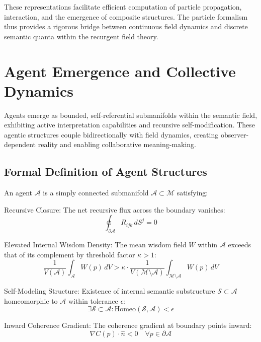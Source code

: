These representations facilitate efficient computation of particle propagation, interaction, and the emergence of composite structures. The particle formalism thus provides a rigorous bridge between continuous field dynamics and discrete semantic quanta within the recurgent field theory.

\section{Agent Emergence and Collective Dynamics}

Agents emerge as bounded, self-referential submanifolds within the semantic field, exhibiting active interpretation capabilities and recursive self-modification. These agentic structures couple bidirectionally with field dynamics, creating observer-dependent reality and enabling collaborative meaning-making.

\subsection{Formal Definition of Agent Structures}

An agent \(\mathcal{A}\) is a simply connected submanifold \(\mathcal{A} \subset \mathcal{M}\) satisfying:

Recursive Closure: The net recursive flux across the boundary vanishes:
\begin{equation}
\oint_{\partial \mathcal{A}} R_{ijk} \, dS^j = 0
\end{equation}

Elevated Internal Wisdom Density: The mean wisdom field \(W\) within \(\mathcal{A}\) exceeds that of its complement by threshold factor \(\kappa > 1\):
\begin{equation}
\frac{1}{V(\mathcal{A})} \int_{\mathcal{A}} W(p) \, dV > \kappa \cdot \frac{1}{V(\mathcal{M} \setminus \mathcal{A})} \int_{\mathcal{M} \setminus \mathcal{A}} W(p) \, dV
\end{equation}

Self-Modeling Structure: Existence of internal semantic substructure \(\mathcal{S} \subset \mathcal{A}\) homeomorphic to \(\mathcal{A}\) within tolerance \(\epsilon\):
\begin{equation}
\exists \mathcal{S} \subset \mathcal{A} : \mathrm{Homeo}(\mathcal{S}, \mathcal{A}) < \epsilon
\end{equation}

Inward Coherence Gradient: The coherence gradient at boundary points inward:
\begin{equation}
\nabla C(p) \cdot \hat{n} < 0 \quad \forall p \in \partial \mathcal{A}
\end{equation}


